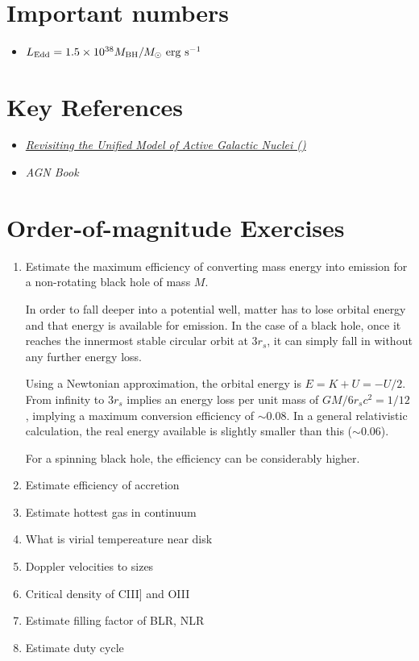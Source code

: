 \section{Important numbers}

\begin{itemize}
\item $L_{\rm Edd} = 1.5 \times 10^{38} M_{\rm BH} / M_\odot {\rm
~erg~s}^{-1}$
\end{itemize}

\section{Key References}

\begin{itemize}
  \item
    \href{https://ui.adsabs.harvard.edu/abs/2015ARA%26A..53..365N/abstract}
    {{\it Revisiting the Unified Model of Active Galactic Nuclei
      (\citealt{netzer15a})}}
  \item
    {\it AGN Book}
\end{itemize}

\section{Order-of-magnitude Exercises}

\begin{enumerate} 
\item Estimate the maximum efficiency of converting mass energy
    into emission for a non-rotating black hole of mass $M$.

\begin{answer}
In order to fall deeper into a potential well, matter has to lose
orbital energy and that energy is available for emission. In the case
of a black hole, once it reaches the innermost stable circular orbit
at $3r_s$, it can simply fall in without any further energy loss.

Using a Newtonian approximation, the orbital energy is $E = K + U =
-U/2$. From infinity to $3r_s$ implies an energy loss per unit mass of
$GM/6r_sc^2 = 1 / 12$, implying a maximum conversion efficiency of
$\sim 0.08$. In a general relativistic calculation, the real energy
available is slightly smaller than this ($\sim 0.06$).

For a spinning black hole, the efficiency can be considerably higher.
\end{answer}

\item Estimate efficiency of accretion
\item Estimate hottest gas in continuum
\item What is virial tempereature near disk
\item Doppler velocities to sizes
\item Critical density of CIII] and OIII
\item Estimate filling factor of BLR, NLR
\item Estimate duty cycle
\end{enumerate} 

